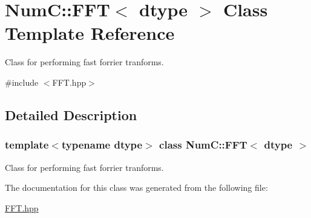\hypertarget{class_num_c_1_1_f_f_t}{}\section{NumC\+:\+:F\+FT$<$ dtype $>$ Class Template Reference}
\label{class_num_c_1_1_f_f_t}


Class for performing fast forrier tranforms.  




{\ttfamily \#include $<$F\+F\+T.\+hpp$>$}



\subsection{Detailed Description}
\subsubsection*{template$<$typename dtype$>$\newline
class Num\+C\+::\+F\+F\+T$<$ dtype $>$}

Class for performing fast forrier tranforms. 

The documentation for this class was generated from the following file\+:\begin{DoxyCompactItemize}
\item 
\mbox{\hyperlink{_f_f_t_8hpp}{F\+F\+T.\+hpp}}\end{DoxyCompactItemize}
